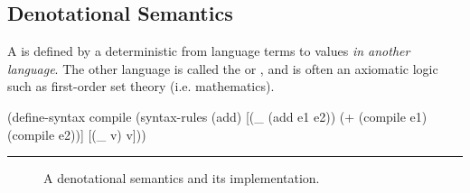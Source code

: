 \subsection{Denotational Semantics}

A  is defined by a deterministic  from language terms to values \emph{in another language}.
The other language is called the  or , and is often an axiomatic logic such as first-order set theory (i.e. mathematics).

\newsavebox{\compileonebox}

\begin{lrbox}{\compileonebox}
\begin{varwidth}[b]{3.3in}
\singlespacing\centering
\begin{schemedisplay}
(define-syntax compile
  (syntax-rules (add)
    [(_ (add e1 e2))  (+ (compile e1)
                         (compile e2))]
    [(_ v)  v]))
\end{schemedisplay}
\hrule
\end{varwidth}
\end{lrbox}

\begin{figure}[tb]\centering
{}
\tab\tab
{}
\caption[Denotational semantics and implementation]{A denotational semantics and its implementation.}
\label{fig:add-denotational}
\end{figure}

